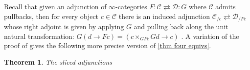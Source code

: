 \documentclass{amsart}
\makeatletter
\newcommand{\inert}{\mathbf{I}}
\newcommand{\contr}{\mathbf{C}}
\newcommand{\simpl}{\mathbf{\Delta}}
\newcommand*\wt[1]{\mathpalette\wthelper{#1}}
\newcommand*\wthelper[2]{%
        \hbox{\dimen@\accentfontxheight#1%
                \accentfontxheight#11.3\dimen@
                $\m@th#1\widetilde{#2}$%
                \accentfontxheight#1\dimen@
        }%
}
\newcommand*\accentfontxheight[1]{%
        \fontdimen5\ifx#1\displaystyle
                \textfont
        \else\ifx#1\textstyle
                \textfont
        \else\ifx#1\scriptstyle
                \scriptfont
        \else
                \scriptscriptfont
        \fi\fi\fi3
}
\newcommand{\Tsimpl}{\wt\simpl}
\newcommand{\Tcontr}{\wt\contr}
\newcommand{\Tinert}{\wt\inert}
\newcommand{\lilh}{\mathsf{h}}
\newcommand{\lilj}{\mathsf{j}}
\newcommand{\pre}{\mathcal{P}}
\newcommand{\culf}{\textup{culf}}
\newcommand{\cons}{\textup{cons}}
\newtheorem{theorem}{Theorem}[section]
\theoremstyle{definition}
\theoremstyle{noname}
\makeatother
\begin{document}
Recall that given an adjunction of $\infty$-categories $F : \mathcal{C} \rightleftarrows \mathcal{D} : G$ where $\mathcal{C}$ admits pullbacks, then for every object $c\in \mathcal{C}$ there is an induced adjunction $\mathcal{C}_{/c} \rightleftarrows \mathcal{D}_{/Fc}$ whose right adjoint is given by applying $G$ and pulling back along the unit natural transformation: $G(d\to Fc) = (c \times_{GFc} Gd \to c)$ \cite[Proposition~5.2.5.1]{Lurie:HTT}.
A variation of the proof of \cite[\S8.9]{Hackney-Kock:2210.11191} gives the following more precise version of \cref{thm four equivs}.

\begin{theorem}\label{thm restricted slices}
The sliced adjunctions 
\end{theorem}
\end{document}

